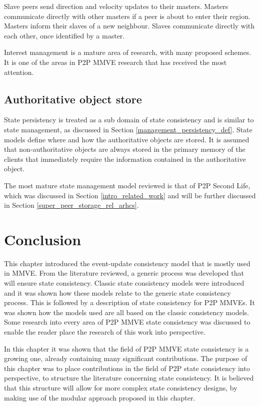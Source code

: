 Slave peers send direction and velocity updates to their masters. Masters communicate directly with other masters if a peer is about to enter their region. Masters inform their slaves of a new neighbour. Slaves communicate directly with each other, once identified by a master.

Interest management is a mature area of research, with many proposed schemes. It is one of the areas in P2P MMVE research that has received the most attention.

\subsection{Authoritative object store}

State persistency is treated as a sub domain of state consistency and is similar to state management, as discussed in Section \ref{management_persistency_def}. State models define where and how the authoritative objects are stored. It is assumed that non-authoritative objects are always stored in the primary memory of the clients that immediately require the information contained in the authoritative object.

The most mature state management model reviewed is that of P2P Second Life, which was discussed in Section \ref{intro_related_work} and will be further discussed in Section \ref{super_peer_storage_rel_arhcs}.

\section{Conclusion}

This chapter introduced the event-update consistency model that is mostly used in MMVE. From the literature reviewed, a generic process was developed that will ensure state consistency. Classic state consistency models were introduced and it was shown how these models relate to the generic state consistency process. This is followed by a description of state consistency for P2P MMVEs. It was shown how the models used are all based on the classic consistency models. Some research into every area of P2P MMVE state consistency was discussed to enable the reader place the research of this work into perspective.

In this chapter it was shown that the field of P2P MMVE state consistency is a growing one, already containing many significant contributions. The purpose of this chapter was to place contributions in the field of P2P state consistency into perspective, to structure the literature concerning state consistency. It is believed that this structure will allow for more complex state consistency designs, by making use of the modular approach proposed in this chapter.

